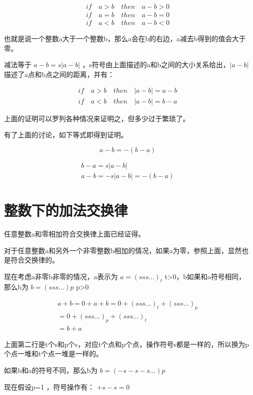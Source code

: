 \documentclass[12pt,oneside]{book}
\begin{document}
\begin{align*}
if \quad a>b \quad then \quad a-b>0\\
if \quad a=b \quad then \quad a-b=0\\
if \quad a<b \quad then \quad a-b<0
\end{align*}

也就是说一个整数a大于一个整数b，那么a会在b的右边，a减去b得到的值会大于零。

减法等于 $a-b = s|a-b|$ ，s符号由上面描述的a和b之间的大小关系给出，$|a-b|$描述了a点和b点之间的距离，并有：

\begin{align*}
if \quad a>b \quad then \quad |a-b| = a-b\\
if \quad a<b \quad then \quad |a-b| = b-a
\end{align*}

上面的证明可以罗列各种情况来证明之，但多少过于繁琐了。

有了上面的讨论，如下等式即得到证明。

\begin{equation}
\label{eq:3.8}
a - b = -(b-a)
\end{equation}

\begin{align*}
b-a = s|a-b| \\
a-b = -s|a-b| = -(b-a)
\end{align*}


\section{整数下的加法交换律}
任意整数a和零相加符合交换律上面已经证得。

对于任意整数a和另外一个非零整数b相加的情况，如果a为零，参照上面，显然也是符合交换律的。

现在考虑a非零b非零的情况，a表示为 $a=(sss...)_t$ t>0，b如果和a符号相同，那么b为 $b=(sss...)p$ p>0 


\begin{align*}
a + b = 0 + a +b = 0 + (sss...)_t + (sss...)_p\\
=0+(sss...)_p + (sss...)_t\\
=b+a
\end{align*}

上面第二行是t个s和p个s，对应t个点和p个点，操作符号s都是一样的，所以换为p个点一堆和t个点一堆是一样的。

如果b和a的符号不同，那么b为 $b=(-s-s-s...)p$ 

现在假设p=1 ，符号操作有： $+s-s=0$ 
\end{document}
